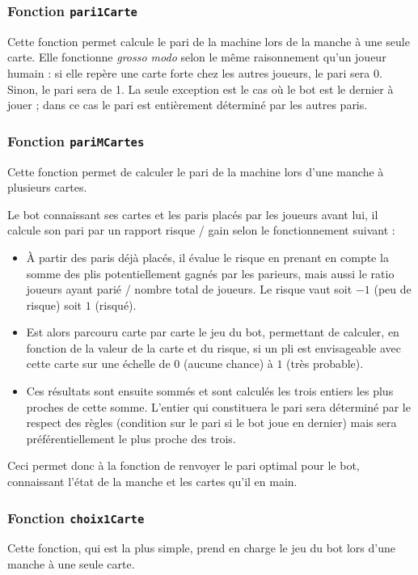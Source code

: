       \subsubsection{Fonction \texttt{pari1Carte}}
         Cette fonction permet calcule le pari de la machine lors de la manche à une seule carte.
         Elle fonctionne \textit{grosso modo} selon le même raisonnement qu'un joueur humain : si elle repère une carte forte chez les autres joueurs, le pari sera 0.
         Sinon, le pari sera de 1.
         La seule exception est le cas où le bot est le dernier à jouer ;
         dans ce cas le pari est entièrement déterminé par les autres paris.

      \subsubsection{Fonction \texttt{pariMCartes}}
         Cette fonction permet de calculer le pari de la machine lors d'une manche à plusieurs cartes.

         Le bot connaissant ses cartes et les paris placés par les joueurs avant lui, il calcule son pari par un rapport risque / gain selon le fonctionnement suivant :
         \begin{itemize}
            \item À partir des paris déjà placés, il évalue le risque en prenant en compte la somme des plis potentiellement gagnés par les parieurs, mais aussi le ratio joueurs ayant parié / nombre total de joueurs.
            Le risque vaut soit $-1$ (peu de risque) soit $1$ (risqué).
            \item Est alors parcouru carte par carte le jeu du bot, permettant de calculer, en fonction de la valeur de la carte et du risque, si un pli est envisageable avec cette carte sur une échelle de $0$ (aucune chance) à $1$ (très probable).
            \item Ces résultats sont ensuite sommés et sont calculés les trois entiers les plus proches de cette somme.
            L'entier qui constituera le pari sera déterminé par le respect des règles (condition sur le pari si le bot joue en dernier) mais sera préférentiellement le plus proche des trois.
         \end{itemize}
         Ceci permet donc à la fonction de renvoyer le pari optimal pour le bot, connaissant l'état de la manche et les cartes qu'il en main.

      \subsubsection{Fonction \texttt{choix1Carte}}
         Cette fonction, qui est la plus simple, prend en charge le jeu du bot lors d'une manche à une seule carte.
         

